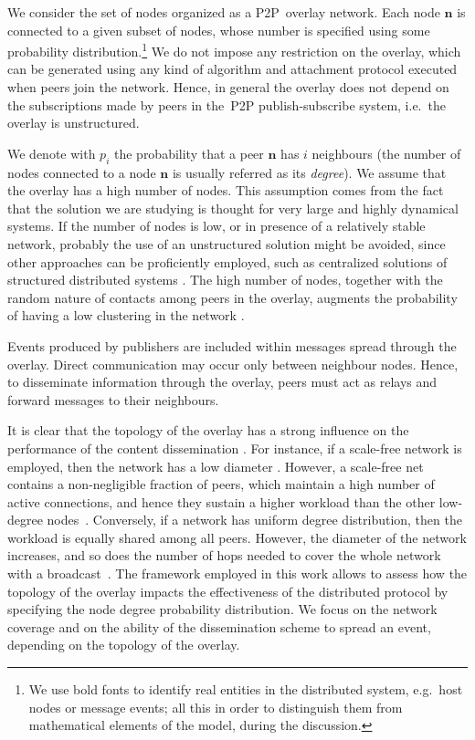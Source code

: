 \documentclass[10pt, conference, compsocconf]{IEEEtran}
\begin{document}
We consider the set of nodes organized as a \ac{P2P}~overlay network. Each node $\mathbf{n}$ is connected to a given subset of nodes, 
whose number is specified using some probability distribution.\footnote{We use bold fonts to identify real entities in the distributed system, e.g.~host nodes or message events; all this in order to distinguish them from mathematical elements of the model, during the discussion.} We do not impose any restriction on the overlay, which can be generated using any kind of algorithm and attachment protocol executed when peers join the network. 
Hence, in general the overlay does not depend on the subscriptions made by peers in the~\ac{P2P} publish-subscribe system, i.e.~the overlay is unstructured.

We denote with $p_i$ the probability that a peer $\mathbf{n}$ has $i$ neighbours (the number of nodes connected to a node $\mathbf{n}$ is usually referred as its \emph{degree}). 
We assume that the overlay has a high number of nodes. This assumption comes from the fact that the solution we are studying is thought for very large and highly dynamical systems. If the number of nodes is low, or in presence of a relatively stable network, probably the use of an unstructured solution might be avoided, since other approaches can be proficiently employed, such as centralized solutions of structured distributed systems \cite{Ahullo:2008,Baldoni:2005,Eugster:2003}.
The high number of nodes, together with the random nature of contacts among peers in the overlay, augments the probability of having a low clustering in the network \cite{newmanHandbook}.

Events produced by publishers are included within messages spread through the overlay.
Direct communication may occur only between neighbour nodes. Hence, to disseminate information through the overlay, peers must act as relays and forward messages to their neighbours. 

It is clear that the topology of the overlay has a strong influence on the performance of the content dissemination \cite{disio11}. 
For instance, if a scale-free network is employed, then the network has a low diameter 
\cite{newman03thestructure}. 
However, a scale-free net contains a non-negligible fraction of peers, which maintain a high number of active connections, and hence they sustain a higher workload than the other low-degree nodes~\cite{Barabasi2000,guclu}. 
Conversely, if a network has uniform degree distribution, then the workload is equally shared among all peers. However, the diameter of the network increases, and so does the number of hops needed to
cover the whole network with a broadcast~\cite{gridpeer}. 
The framework employed in this work allows to assess how the topology of the overlay impacts the effectiveness of the distributed protocol by specifying the node degree probability distribution.
We focus on the network coverage and on the ability of the dissemination scheme to spread an event, depending on the topology of the overlay.
\end{document}
